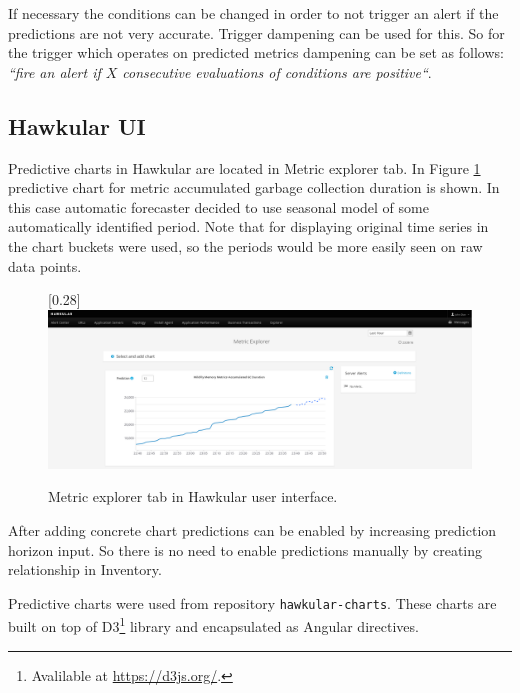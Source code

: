         If necessary the conditions can be changed in
        order to not trigger an alert if the predictions are not very accurate. Trigger dampening can be used for this.
        So for the trigger which operates on predicted metrics dampening can be set as follows: \emph{``fire an alert if
        $X$ consecutive evaluations of conditions are positive``}.

        \subsection{Hawkular UI}
        Predictive charts in Hawkular are located in Metric explorer tab. In Figure \ref{img:hawkular-explorer}
        predictive chart for metric accumulated garbage collection duration is shown. In this case automatic
        forecaster decided to use seasonal model of some automatically identified period. Note that for displaying
        original time series in the chart buckets were used, so the periods would be more easily seen on raw data
        points.

        \begin{figure}[H]
            \begin{center}
                \scalebox{0.185}[0.28]{\includegraphics[angle=0]{img/hawkular-explorer.pdf}}
                \caption{Metric explorer tab in Hawkular user interface.}
                \label{img:hawkular-explorer}
            \end{center}
        \end{figure}

        After adding concrete chart predictions can be enabled by increasing prediction horizon input.
        So there is no need to enable predictions manually by creating relationship in Inventory.

        Predictive charts were used from repository \texttt{hawkular-charts}. These charts are built on top of
        D3\footnote{Avalilable at \url{https://d3js.org/}.} library and encapsulated as Angular directives.

